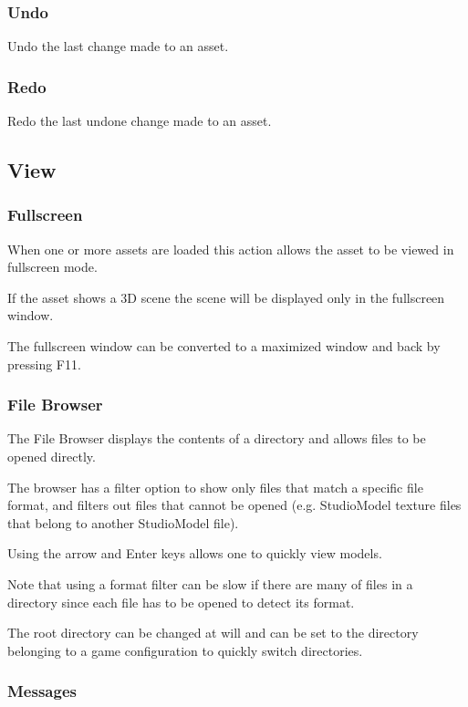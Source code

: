 \documentclass[10pt, a4paper, titlepage, oneside]{article}
\begin{document}
\subsubsection{Undo}

Undo the last change made to an asset.

\subsubsection{Redo}

Redo the last undone change made to an asset.

\subsection{View}

\subsubsection{Fullscreen}

When one or more assets are loaded this action allows the asset to be viewed in fullscreen mode.

If the asset shows a 3D scene the scene will be displayed only in the fullscreen window.

The fullscreen window can be converted to a maximized window and back by pressing F11.

\subsubsection{File Browser}

The File Browser displays the contents of a directory and allows files to be opened directly.

The browser has a filter option to show only files that match a specific file format, and filters out files that cannot be opened (e.g. StudioModel texture files that belong to another StudioModel file).

Using the arrow and Enter keys allows one to quickly view models.

Note that using a format filter can be slow if there are many of files in a directory since each file has to be opened to detect its format.

The root directory can be changed at will and can be set to the directory belonging to a game configuration to quickly switch directories.

\subsubsection{Messages}
\end{document}
